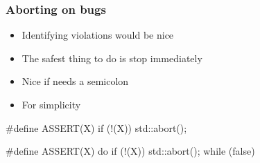 \begin{frame}[fragile]
  \frametitle{Aborting on bugs}

  \begin{itemize}
  \item<1-> Identifying violations would be nice
  \item<2-> The safest thing to do is stop immediately
  \item<3-> Nice if  needs a semicolon
  \item<4-> For simplicity
  \end{itemize}
\begin{overprint}
\begin{cppcodebox}
#define ASSERT(X) if (!(X)) { std::abort(); }
\end{cppcodebox}

\begin{cppcodebox}
#define ASSERT(X) do { if (!(X)) { std::abort(); } } while (false)
\end{cppcodebox}

\end{overprint}

\end{frame}


